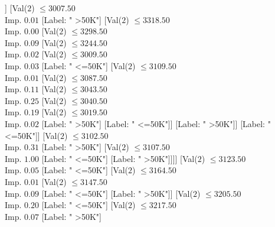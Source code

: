 \documentclass[margin=10pt]{standalone}
\begin{document}
\begin{forest}
																									[Label: " <=50K"]]
																								[Val($2$) $ \leq 3007.50$ \\ Imp. $0.01$
																									[Label: " >50K"]
																									[Val($2$) $ \leq 3318.50$ \\ Imp. $0.00$
																										[Val($2$) $ \leq 3298.50$ \\ Imp. $0.09$
																											[Val($2$) $ \leq 3244.50$ \\ Imp. $0.02$
																												[Val($2$) $ \leq 3009.50$ \\ Imp. $0.03$
																													[Label: " <=50K"]
																													[Val($2$) $ \leq 3109.50$ \\ Imp. $0.01$
																														[Val($2$) $ \leq 3087.50$ \\ Imp. $0.11$
																															[Val($2$) $ \leq 3043.50$ \\ Imp. $0.25$
																																[Val($2$) $ \leq 3040.50$ \\ Imp. $0.19$
																																	[Val($2$) $ \leq 3019.50$ \\ Imp. $0.02$
																																		[Label: " >50K"]
																																		[Label: " <=50K"]]
																																	[Label: " >50K"]]
																																[Label: " <=50K"]]
																															[Val($2$) $ \leq 3102.50$ \\ Imp. $0.31$
																																[Label: " >50K"]
																																[Val($2$) $ \leq 3107.50$ \\ Imp. $1.00$
																																	[Label: " <=50K"]
																																	[Label: " >50K"]]]]
																														[Val($2$) $ \leq 3123.50$ \\ Imp. $0.05$
																															[Label: " <=50K"]
																															[Val($2$) $ \leq 3164.50$ \\ Imp. $0.01$
																																[Val($2$) $ \leq 3147.50$ \\ Imp. $0.09$
																																	[Label: " <=50K"]
																																	[Label: " >50K"]]
																																[Val($2$) $ \leq 3205.50$ \\ Imp. $0.20$
																																	[Label: " <=50K"]
																																	[Val($2$) $ \leq 3217.50$ \\ Imp. $0.07$
																																		[Label: " >50K"]

\end{forest}
\end{document}
